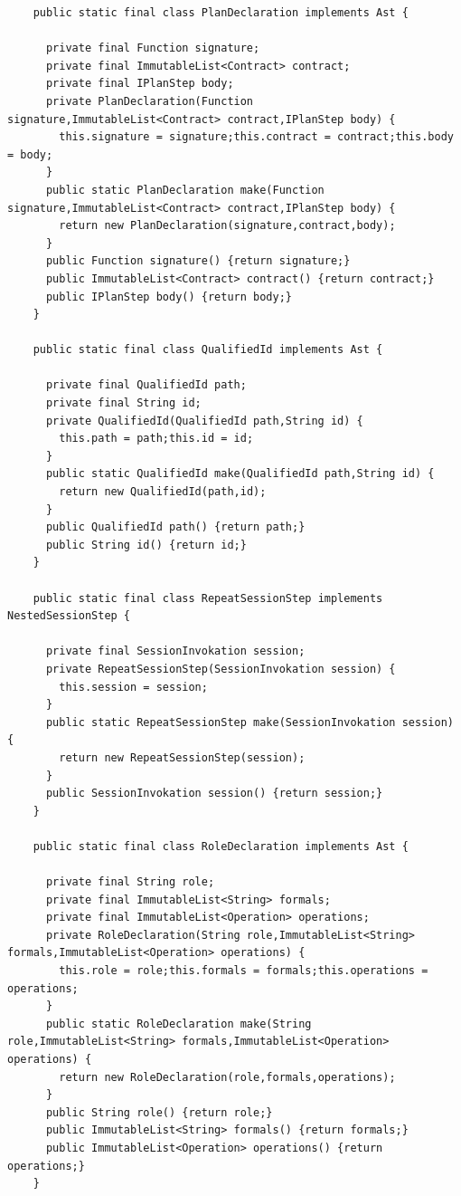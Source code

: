 \documentclass[a4paper,12pt,oneside,fleqn]{book} %
\begin{document}
{\begin{verbatim}
    public static final class PlanDeclaration implements Ast {
      
      private final Function signature;
      private final ImmutableList<Contract> contract;
      private final IPlanStep body;
      private PlanDeclaration(Function signature,ImmutableList<Contract> contract,IPlanStep body) {
        this.signature = signature;this.contract = contract;this.body = body;
      }
      public static PlanDeclaration make(Function signature,ImmutableList<Contract> contract,IPlanStep body) {
        return new PlanDeclaration(signature,contract,body);
      }
      public Function signature() {return signature;}
      public ImmutableList<Contract> contract() {return contract;}
      public IPlanStep body() {return body;}
    }
  
    public static final class QualifiedId implements Ast {
      
      private final QualifiedId path;
      private final String id;
      private QualifiedId(QualifiedId path,String id) {
        this.path = path;this.id = id;
      }
      public static QualifiedId make(QualifiedId path,String id) {
        return new QualifiedId(path,id);
      }
      public QualifiedId path() {return path;}
      public String id() {return id;}
    }
  
    public static final class RepeatSessionStep implements NestedSessionStep {
      
      private final SessionInvokation session;
      private RepeatSessionStep(SessionInvokation session) {
        this.session = session;
      }
      public static RepeatSessionStep make(SessionInvokation session) {
        return new RepeatSessionStep(session);
      }
      public SessionInvokation session() {return session;}
    }
  
    public static final class RoleDeclaration implements Ast {
      
      private final String role;
      private final ImmutableList<String> formals;
      private final ImmutableList<Operation> operations;
      private RoleDeclaration(String role,ImmutableList<String> formals,ImmutableList<Operation> operations) {
        this.role = role;this.formals = formals;this.operations = operations;
      }
      public static RoleDeclaration make(String role,ImmutableList<String> formals,ImmutableList<Operation> operations) {
        return new RoleDeclaration(role,formals,operations);
      }
      public String role() {return role;}
      public ImmutableList<String> formals() {return formals;}
      public ImmutableList<Operation> operations() {return operations;}
    }
  

\end{verbatim}}
\end{document}
